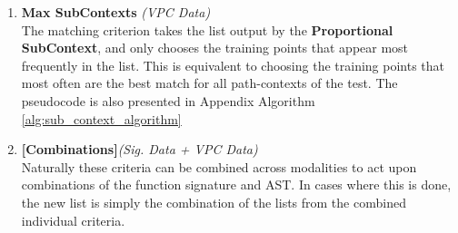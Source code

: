 \begin{enumerate}
    \item\textbf{Max SubContexts} \textit{(VPC Data)}\\The matching criterion takes the list output by the \textbf{Proportional SubContext}, and only chooses the training points that appear most frequently in the list. This is equivalent to choosing the training points that most often are the best match for all path-contexts of the test. The pseudocode is also presented in Appendix Algorithm \ref{alg:sub_context_algorithm} 
    \item\textbf{[Combinations]}\textit{(Sig. Data + VPC Data)} \\ Naturally these criteria can be combined across modalities to act upon combinations of the function signature and AST. In cases where this is done, the new list is simply the combination of the lists from the combined individual criteria. 
\end{enumerate}









\begin{table}[h!]

    \caption{A summary of the BestMatchingSet algorithms we use in the experiments. For sake of simplicity, a \textit{best-effort} match here refers to the match with longest matching subsequence, when treating a VPC as one long sequence}
    \label{tab:matching_summary}
\end{table}





